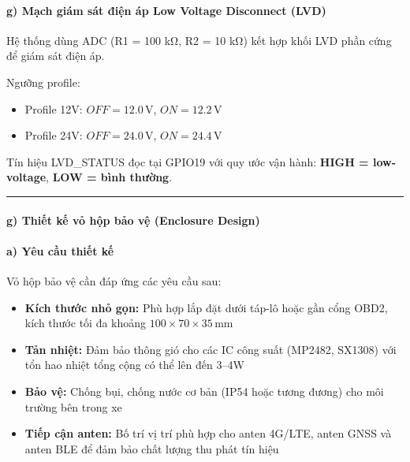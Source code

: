 \documentclass[a4paper]{extarticle}
\providecommand{\tightlist}{%
  \setlength{\itemsep}{0pt}\setlength{\parskip}{0pt}}
\begin{document}
\paragraph{g) Mạch giám sát điện áp Low Voltage Disconnect
(LVD)}\label{g-mux1ea1ch-giuxe1m-suxe1t-ux111iux1ec7n-uxe1p-low-voltage-disconnect-lvd}

Hệ thống dùng ADC (R1 = 100 kΩ, R2 = 10 kΩ) kết hợp khối LVD phần cứng để
giám sát điện áp.

Ngưỡng profile:

\begin{itemize}
\tightlist
\item
  Profile 12V: \(OFF = 12.0\,\mathrm{V}\), \(ON = 12.2\,\mathrm{V}\)
\item
  Profile 24V: \(OFF = 24.0\,\mathrm{V}\), \(ON = 24.4\,\mathrm{V}\)
\end{itemize}

Tín hiệu LVD\_STATUS đọc tại GPIO19 với quy ước vận hành: \textbf{HIGH =
low-voltage}, \textbf{LOW = bình thường}.

\begin{center}\rule{0.5\linewidth}{0.5pt}\end{center}

\paragraph{g) Thiết kế vỏ hộp bảo vệ (Enclosure
Design)}\label{g-thiux1ebft-kux1ebf-vux1ecf-hux1ed9p-bux1ea3o-vux1ec7-enclosure-design}

\paragraph{a) Yêu cầu thiết
kế}\label{a-yuxeau-cux1ea7u-thiux1ebft-kux1ebf}

Vỏ hộp bảo vệ cần đáp ứng các yêu cầu sau:

\begin{itemize}
\tightlist
\item
  \textbf{Kích thước nhỏ gọn:} Phù hợp lắp đặt dưới táp-lô hoặc gần cổng
  OBD2, kích thước tối đa khoảng
  \(100 \times 70 \times 35\,\mathrm{mm}\)
\item
  \textbf{Tản nhiệt:} Đảm bảo thông gió cho các IC công suất (MP2482,
  SX1308) với tổn hao nhiệt tổng cộng có thể lên đến 3--4W
\item
  \textbf{Bảo vệ:} Chống bụi, chống nước cơ bản (IP54 hoặc tương đương)
  cho môi trường bên trong xe
\item
  \textbf{Tiếp cận anten:} Bố trí vị trí phù hợp cho anten 4G/LTE, anten
  GNSS và anten BLE để đảm bảo chất lượng thu phát tín hiệu
\end{itemize}
\end{document}
